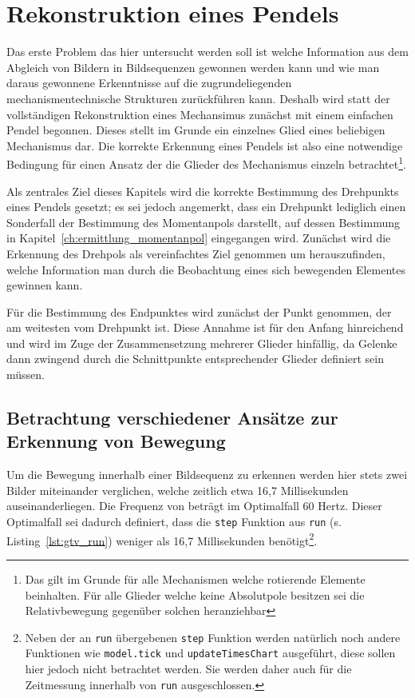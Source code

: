 \chapter{Rekonstruktion eines Pendels}


Das erste Problem das hier untersucht werden soll ist welche Information aus dem Abgleich von Bildern in Bildsequenzen gewonnen werden kann und wie man daraus gewonnene Erkenntnisse auf die zugrundeliegenden mechanismentechnische Strukturen zurückführen kann.
Deshalb wird statt der vollständigen Rekonstruktion eines Mechansimus zunächst mit einem einfachen Pendel begonnen.
Dieses stellt im Grunde ein einzelnes Glied eines beliebigen Mechanismus dar.
Die korrekte Erkennung eines Pendels ist also eine notwendige Bedingung für einen Ansatz der die Glieder des Mechanismus einzeln betrachtet\footnote{Das gilt im Grunde für alle Mechanismen welche rotierende Elemente beinhalten. Für alle Glieder welche keine Absolutpole besitzen sei die Relativbewegung gegenüber solchen heranziehbar}.

Als zentrales Ziel dieses Kapitels wird die korrekte Bestimmung des Drehpunkts eines Pendels gesetzt; es sei jedoch angemerkt, dass ein Drehpunkt lediglich einen Sonderfall der Bestimmung des Momentanpols darstellt, auf dessen Bestimmung in Kapitel~\ref{ch:ermittlung_momentanpol} eingegangen wird.
Zunächst wird die Erkennung des Drehpols als vereinfachtes Ziel genommen um herauszufinden, welche Information man durch die Beobachtung eines sich bewegenden Elementes gewinnen kann.

Für die Bestimmung des Endpunktes wird zunächst der Punkt genommen, der am weitesten vom Drehpunkt ist.
Diese Annahme ist für den Anfang hinreichend und wird im Zuge der Zusammensetzung mehrerer Glieder hinfällig, da Gelenke dann zwingend durch die Schnittpunkte entsprechender Glieder definiert sein müssen.

\section{Betrachtung verschiedener Ansätze zur Erkennung von Bewegung} \label{ch:erkennung_von_änderungen}

Um die Bewegung innerhalb einer Bildsequenz zu erkennen werden hier stets zwei Bilder miteinander verglichen, welche zeitlich etwa 16,7 Millisekunden auseinanderliegen.
Die Frequenz von  beträgt im Optimalfall 60 Hertz.
Dieser Optimalfall sei dadurch definiert, dass die \lstinline{step} Funktion aus \lstinline{run} (s. Listing~\ref{lst:gtv_run}) weniger als 16,7 Millisekunden benötigt\footnote{Neben der an \lstinline{run} übergebenen \lstinline{step} Funktion werden natürlich noch andere Funktionen wie \lstinline{model.tick} und \lstinline{updateTimesChart} ausgeführt, diese sollen hier jedoch nicht betrachtet werden. Sie werden daher auch für die Zeitmessung innerhalb von \lstinline{run} ausgeschlossen.}.

